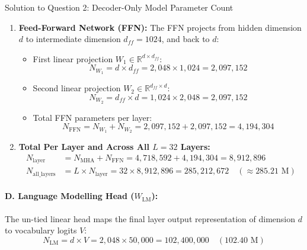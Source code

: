 \documentclass[11pt,a4paper]{article}
\begin{document}
\begin{solutionbox}{Solution to Question 2: Decoder-Only Model Parameter Count}
\begin{enumerate}[label=\textbf{\roman*.}]
    \item \textbf{Feed-Forward Network (FFN):}
    The FFN projects from hidden dimension $d$ to intermediate dimension $d_{ff} = 1024$, and back to $d$:
    \begin{itemize}[itemsep=1pt]
        \item First linear projection $W_1 \in \mathbb{R}^{d \times d_{ff}}$:
        \begin{equation*}
            N_{W_1} = d \times d_{ff} = 2{,}048 \times 1{,}024 = 2{,}097{,}152
        \end{equation*}
        \item Second linear projection $W_2 \in \mathbb{R}^{d_{ff} \times d}$:
        \begin{equation*}
            N_{W_2} = d_{ff} \times d = 1{,}024 \times 2{,}048 = 2{,}097{,}152
        \end{equation*}
        \item Total FFN parameters per layer:
        \begin{equation*}
            N_{\text{FFN}} = N_{W_1} + N_{W_2} = 2{,}097{,}152 + 2{,}097{,}152 = 4{,}194{,}304
        \end{equation*}
    \end{itemize}
    
    \item \textbf{Total Per Layer and Across All $L = 32$ Layers:}
    \begin{align*}
        N_{\text{layer}} &= N_{\text{MHA}} + N_{\text{FFN}} = 4{,}718{,}592 + 4{,}194{,}304 = 8{,}912{,}896 \\
        N_{\text{all\_layers}} &= L \times N_{\text{layer}} = 32 \times 8{,}912{,}896 = 285{,}212{,}672 \quad (\approx 285.21\text{ M})
    \end{align*}
\end{enumerate}

\paragraph{D. Language Modelling Head ($W_{\text{LM}}$):}
The un-tied linear head maps the final layer output representation of dimension $d$ to vocabulary logits $V$:
\begin{equation}
    N_{\text{LM}} = d \times V = 2{,}048 \times 50{,}000 = 102{,}400{,}000 \quad (102.40\text{ M})
\end{equation}


\end{solutionbox}
\end{document}
